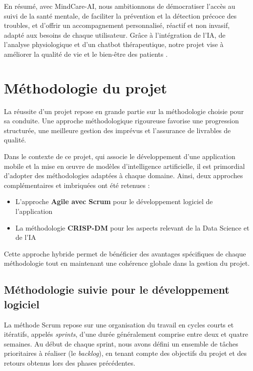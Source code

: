 En résumé, avec MindCare-AI, nous ambitionnons de démocratiser l’accès au suivi de la santé mentale, de faciliter la prévention et la détection précoce des troubles, et d’offrir un accompagnement personnalisé, réactif et non invasif, adapté aux besoins de chaque utilisateur. Grâce à l’intégration de l’IA, de l’analyse physiologique et d’un chatbot thérapeutique, notre projet vise à améliorer la qualité de vie et le bien-être des patients .
\section{Méthodologie du projet}

La réussite d'un projet repose en grande partie sur la méthodologie choisie pour sa conduite. Une approche méthodologique rigoureuse favorise une progression structurée, une meilleure gestion des imprévus et l'assurance de livrables de qualité. 

Dans le contexte de ce projet, qui associe le développement d'une application mobile et la mise en œuvre de modèles d'intelligence artificielle, il est primordial d'adopter des méthodologies adaptées à chaque domaine. Ainsi, deux approches complémentaires et imbriquées ont été retenues : 

\begin{itemize}
    \item L'approche \textbf{Agile avec Scrum} pour le développement logiciel de l'application
    \item La méthodologie \textbf{CRISP-DM} pour les aspects relevant de la Data Science et de l'IA
\end{itemize}

Cette approche hybride permet de bénéficier des avantages spécifiques de chaque méthodologie tout en maintenant une cohérence globale dans la gestion du projet.

\subsection{Méthodologie suivie pour le développement logiciel}

La méthode Scrum repose sur une organisation du travail en cycles courts et itératifs, appelés \textit{sprints}, d’une durée généralement comprise entre deux et quatre semaines. Au début de chaque sprint, nous avons défini un ensemble de tâches prioritaires à réaliser (le \textit{backlog}), en tenant compte des objectifs du projet et des retours obtenus lors des phases précédentes.

